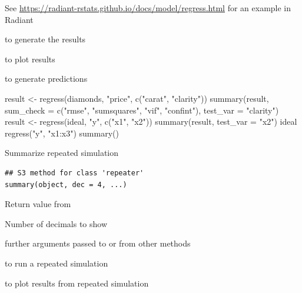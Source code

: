 \documentclass[a4paper]{book}
\begin{document}
%
\begin{Details}
See \url{https://radiant-rstats.github.io/docs/model/regress.html} for an example in Radiant
\end{Details}
%
\begin{SeeAlso}
 to generate the results

 to plot results

 to generate predictions
\end{SeeAlso}
%
\begin{Examples}
\begin{ExampleCode}
result <- regress(diamonds, "price", c("carat", "clarity"))
summary(result, sum_check = c("rmse", "sumsquares", "vif", "confint"), test_var = "clarity")
result <- regress(ideal, "y", c("x1", "x2"))
summary(result, test_var = "x2")
ideal %
  regress("y", "x1:x3") %
  summary()

\end{ExampleCode}
\end{Examples}
%
\begin{Description}
Summarize repeated simulation
\end{Description}
%
\begin{Usage}
\begin{verbatim}
## S3 method for class 'repeater'
summary(object, dec = 4, ...)
\end{verbatim}
\end{Usage}
%
\begin{Arguments}
\begin{ldescription}
\item[\code{object}] Return value from 

\item[\code{dec}] Number of decimals to show

\item[\code{...}] further arguments passed to or from other methods
\end{ldescription}
\end{Arguments}
%
\begin{SeeAlso}
 to run a repeated simulation

 to plot results from repeated simulation
\end{SeeAlso}
\end{document}
